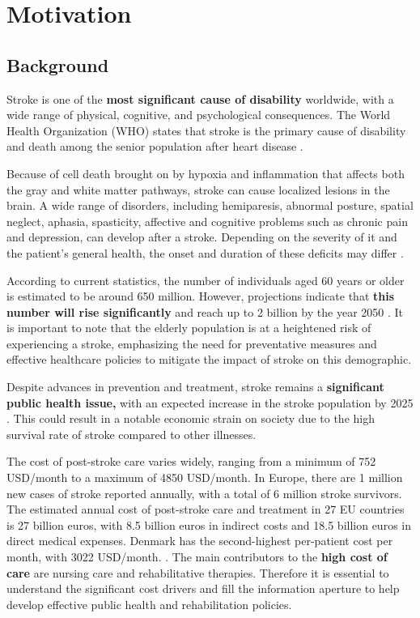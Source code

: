 \chapter{Motivation}
\section{Background}

Stroke is one of the \textbf{most significant cause of disability }worldwide, with a wide range of physical, cognitive, and psychological consequences. The World Health Organization (WHO) states that stroke is the primary cause of disability and death among the senior population after heart disease \cite{WHO}.

Because of cell death brought on by hypoxia and inflammation that affects both the gray and white matter pathways, stroke can cause localized lesions in the brain. A wide range of disorders, including hemiparesis, abnormal posture, spatial neglect, aphasia, spasticity, affective and cognitive problems such as chronic pain and depression, can develop after a stroke. Depending on the severity of it and the patient's general health, the onset and duration of these deficits may differ \cite{Corbetta2015}.

 According to current statistics, the number of individuals aged 60 years or older is estimated to be around 650 million. However, projections indicate that \textbf{this number will rise significantly }and reach up to 2 billion by the year 2050 \cite{Cardiovascular}. It is important to note that the elderly population is at a heightened risk of experiencing a stroke, emphasizing the need for preventative measures and effective healthcare policies to mitigate the impact of stroke on this demographic.

Despite advances in prevention and treatment, stroke remains a \textbf{significant public health issue,} with an expected increase in the stroke population by 2025 \cite{Anwer2022}. This could result in a notable economic strain on society due to the high survival rate of stroke compared to other illnesses.

The cost of post-stroke care varies widely, ranging from a minimum of 752 USD/month to a maximum of 4850 USD/month. In Europe, there are 1 million new cases of stroke reported annually, with a total of 6 million stroke survivors. The estimated annual cost of post-stroke care and treatment in 27 EU countries is 27 billion euros, with 8.5 billion euros in indirect costs and 18.5 billion euros in direct medical expenses. Denmark has the second-highest per-patient cost per month, with 3022 USD/month. \cite{Rochmah2021}.  The main contributors to the \textbf{high cost of care} are nursing care and rehabilitative therapies. Therefore it is essential to understand the significant cost drivers and fill the information aperture to help develop effective public health and rehabilitation policies. 

